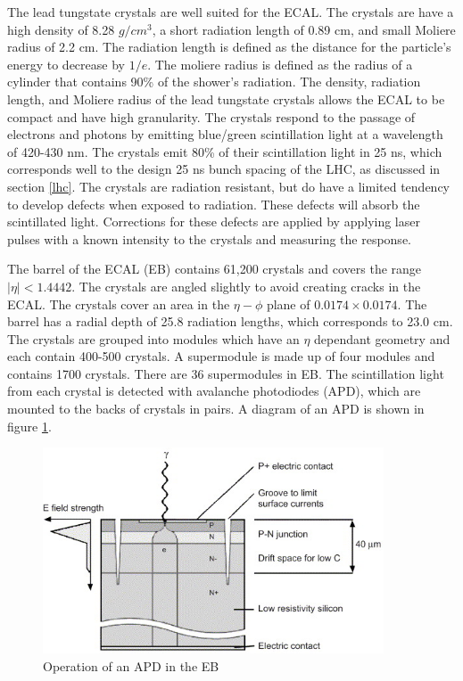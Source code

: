 \documentclass[oneside, letterpaper, oldfontcommands]{memoir}
\begin{document}
\qquad The lead tungstate crystals are well suited for the ECAL. The crystals are have a high density of 8.28 $g/cm^{3}$, a short radiation length of 0.89 cm, and small Moliere radius of 2.2 cm. The radiation length is defined as the distance for the particle's energy to decrease by $1/e$. The moliere radius is defined as the radius of a cylinder that contains 90\% of the shower's radiation. The density, radiation length, and Moliere radius of the lead tungstate crystals allows the ECAL to be compact and have high granularity. The crystals respond to the passage of electrons and photons by emitting blue/green scintillation light at a wavelength of 420-430 nm. The crystals emit 80\% of their scintillation light in 25 ns, which corresponds well to the design 25 ns bunch spacing of the LHC, as discussed in section \ref{lhc}. The crystals are radiation resistant, but do have a limited tendency to develop defects when exposed to radiation. These defects will absorb the scintillated light. Corrections for these defects are applied by applying laser pulses with a known intensity to the crystals and measuring the response.

\qquad The barrel of the ECAL (EB) contains 61,200 crystals and covers the range $|\eta| < 1.4442$. The crystals are angled slightly to avoid creating cracks in the ECAL. The crystals cover an area in the $\eta - \phi$ plane of $0.0174 \times 0.0174$. The barrel has a radial depth of 25.8 radiation lengths, which corresponds to 23.0 cm. The crystals are grouped into modules which have an $\eta$ dependant geometry and each contain 400-500 crystals. A supermodule is made up of four modules and contains 1700 crystals. There are 36 supermodules in EB. The scintillation light from each crystal is detected with avalanche photodiodes (APD), which are mounted to the backs of crystals in pairs. A diagram of an APD is shown in figure \ref{fig:APD}. 

\begin{figure}[here]
\includegraphics[width=0.9\textwidth]{apd.jpg}
\caption{Operation of an APD in the EB  \cite{Brown:2007cg}}
\label{fig:APD}
\end{figure}
\end{document}
